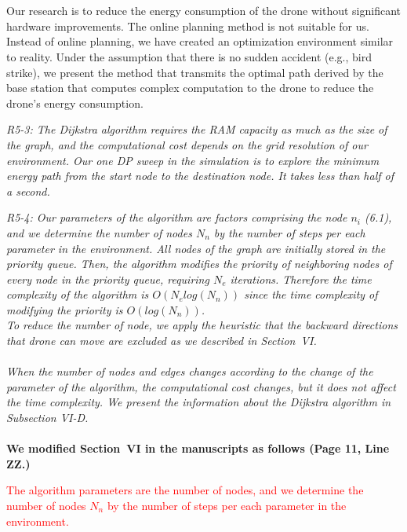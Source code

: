\documentclass[onecolumn]{IEEEconf}
\begin{document}
\begin{description}
{	~\\
	~\\
    Our research is to reduce the energy consumption of the drone without significant hardware improvements. The online planning method is not suitable for us.
    Instead of online planning, we have created an optimization environment similar to reality.
    Under the assumption that there is no sudden accident (e.g., bird strike), we present the method that transmits the optimal path derived by the base station that computes complex computation to the drone to reduce the drone's energy consumption.
	}
	~\\
	\item \textit
	{
	R5-3: The Dijkstra algorithm requires the RAM capacity as much as the size of the graph, and the computational cost depends on the grid resolution of our environment.
    Our one DP sweep in the simulation is to explore the minimum energy path from the start node to the destination node. It takes less than half of a second.
	}
	~\\
	\item \textit
	{
	R5-4: Our parameters of the algorithm are factors comprising the node $n_i$ (6.1), and we determine the number of nodes $N_n$ by the number of steps per each parameter in the environment. 
    All nodes of the graph are initially stored in the priority queue. Then, the algorithm modifies the priority of neighboring nodes of every node in the priority queue, requiring $N_e$ iterations. Therefore the time complexity of the algorithm is $O(N_e log(N_n))$ since the time complexity of modifying the priority is $O(log(N_n))$.~\\
    To reduce the number of node, we apply the heuristic that the backward directions that drone can move are excluded as we described in Section~VI.
    \\
    \\
    When the number of nodes and edges changes according to the change of the parameter of the algorithm, the computational cost changes, but it does not affect the time complexity.
    We present the information about the Dijkstra algorithm in Subsection VI-D.
	}
	~\\
    ~\\
	\textbf{We modified Section~VI in the manuscripts as follows (Page 11, Line ZZ.)}\\
    \begin{mdframed}[ linewidth=.75pt, userdefinedwidth=0.9\textwidth]
    \textcolor{red}{
    The algorithm parameters are the number of nodes, and we determine the number of nodes $N_n$ by the number of steps per each parameter in the environment.  
}
\end{mdframed}
\end{description}
\end{document}

